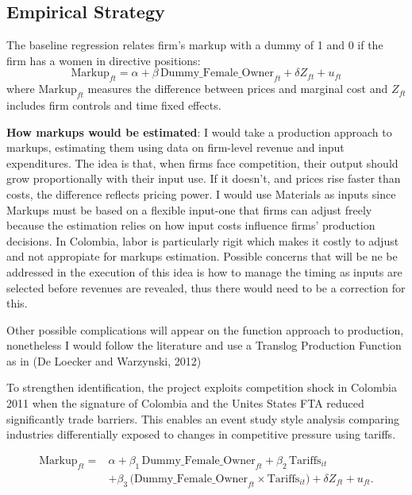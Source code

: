 \documentclass[11pt]{article}
\begin{document}
\subsection*{Empirical Strategy}
The baseline regression relates firm's markup with a dummy of 1 and 0 if the firm has a women in directive positions:
\begin{equation} 
\text{Markup}_{ft} = \alpha + \beta \, \text{Dummy\_Female\_Owner}_{ft} + \delta Z_{ft} + u_{ft}
\end{equation}
where $\text{Markup}_{ft}$ measures the difference between prices and marginal cost and $Z_{ft}$ includes firm controls and time fixed effects.

\textbf{How markups would be estimated}: I would take a production  approach to markups, estimating them using data on firm-level revenue and input expenditures.  The  idea  is  that, when firms face competition, their output should grow proportionally with their input use. If it doesn't, and prices rise faster than costs, the difference reflects pricing power. I would use Materials as inputs since Markups must be based on a flexible input-one that firms can adjust freely because the estimation relies on how input costs influence firms' production decisions. In Colombia, labor is particularly rigit which makes it costly to adjust and not appropiate for markups estimation. Possible concerns that will be ne be addressed in the execution of this idea is how to manage the timing as inputs are selected before revenues are revealed, thus there would need to be a correction for this.

Other possible complications will appear on the function approach to production, nonetheless I would follow the literature and use a Translog Production Function as in (De Loecker and Warzynski, 2012)

To strengthen identification, the project exploits competition shock in Colombia 2011 when the signature of Colombia and the Unites States FTA reduced significantly trade barriers. This enables an event study style analysis comparing industries differentially exposed to changes in competitive pressure using tariffs.

\begin{equation}
\begin{aligned}
\text{Markup}_{ft} ={}& \alpha + \beta_{1} \, \text{Dummy\_Female\_Owner}_{ft} + \beta_{2} \, \text{Tariffs}_{it} \\
&+ \beta_{3}\,\bigl(\text{Dummy\_Female\_Owner}_{ft} \times \text{Tariffs}_{it}\bigr) + \delta Z_{ft} + u_{ft}.
\end{aligned}
\end{equation}
\end{document}
